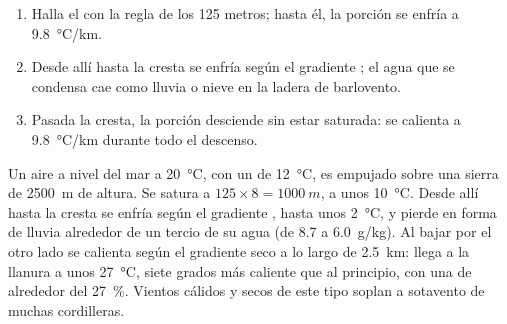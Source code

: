 \begin{method}\label{met:g10:why-clouds-form:mountain}
\begin{enumerate}
  \item Halla el  con la regla de los 125 metros; hasta
        él, la porción se enfría a \qty{9.8}{\degreeCelsius/km}.
  \item Desde allí hasta la cresta se enfría según el gradiente ; el
        agua que se condensa cae como lluvia o nieve en la ladera de
        barlovento.
  \item Pasada la cresta, la porción desciende sin estar saturada: se
        calienta a \qty{9.8}{\degreeCelsius/km} durante todo el descenso.
\end{enumerate}
\end{method}

\begin{example}\label{ex:g10:why-clouds-form:lee}
Un aire a nivel del mar a \qty{20}{\degreeCelsius}, con un 
de \qty{12}{\degreeCelsius}, es empujado sobre una sierra de \qty{2500}{m}
de altura. Se satura a $125 \times 8 = \qty{1000}{m}$, a unos
\qty{10}{\degreeCelsius}. Desde allí hasta la cresta se enfría según el
gradiente , hasta unos \qty{2}{\degreeCelsius}, y pierde en forma de
lluvia alrededor de un tercio de su agua (de \num{8.7} a \qty{6.0}{g/kg}).
Al bajar por el otro lado se calienta según el gradiente seco a lo largo de
\qty{2.5}{km}: llega a la llanura a unos \qty{27}{\degreeCelsius}, siete
grados más caliente que al principio, con una  de alrededor
del \qty{27}{\percent}. Vientos cálidos y secos de este tipo soplan a
sotavento de muchas cordilleras.
\end{example}

